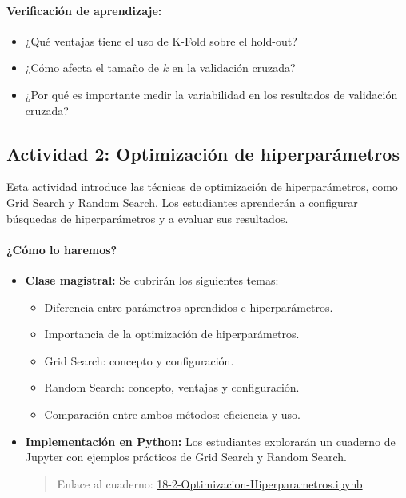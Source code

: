 \documentclass[a4,11pt]{aleph-notas}
\begin{document}
\paragraph{Verificación de aprendizaje:}  
\begin{itemize}[leftmargin=*]
    \item ¿Qué ventajas tiene el uso de K-Fold sobre el hold-out?
    \item ¿Cómo afecta el tamaño de \(k\) en la validación cruzada?
    \item ¿Por qué es importante medir la variabilidad en los resultados de validación cruzada?
\end{itemize}

\subsection*{Actividad 2: Optimización de hiperparámetros}

Esta actividad introduce las técnicas de optimización de hiperparámetros, como Grid Search y Random Search. Los estudiantes aprenderán a configurar búsquedas de hiperparámetros y a evaluar sus resultados.

\paragraph{¿Cómo lo haremos?}  
\begin{itemize}[leftmargin=*]
    \item \textbf{Clase magistral:} Se cubrirán los siguientes temas:
    \begin{itemize}
        \item Diferencia entre parámetros aprendidos e hiperparámetros.
        \item Importancia de la optimización de hiperparámetros.
        \item Grid Search: concepto y configuración.
        \item Random Search: concepto, ventajas y configuración.
        \item Comparación entre ambos métodos: eficiencia y uso.
    \end{itemize}
    \item \textbf{Implementación en Python:} Los estudiantes explorarán un cuaderno de Jupyter con ejemplos prácticos de Grid Search y Random Search.
    \begin{quote}
        Enlace al cuaderno: \href{https://colab.research.google.com/github/andres-merino/AprendizajeAutomaticoInicial-05-N0105/blob/main/2-Notebooks/18-2-Optimizacion-Hiperparametros.ipynb}{18-2-Optimizacion-Hiperparametros.ipynb}.
    \end{quote}
\end{itemize}
\end{document}
